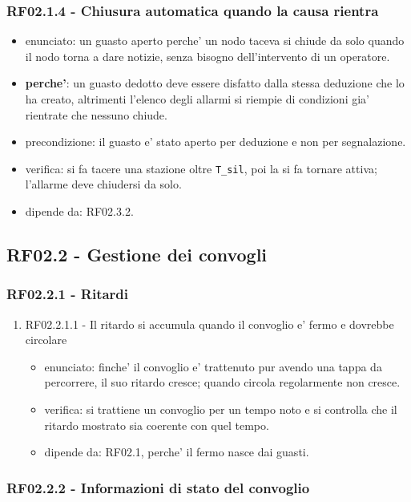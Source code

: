 \documentclass[11pt]{article}
\begin{document}
\subsubsection{RF02.1.4 - Chiusura automatica quando la causa rientra}
\label{sec:orgb6d0a62}
\begin{itemize}
\item enunciato: un guasto aperto perche' un nodo taceva si chiude da solo quando il nodo torna a dare
notizie, senza bisogno dell'intervento di un operatore.
\item \textbf{perche'}: un guasto dedotto deve essere disfatto dalla stessa deduzione che lo ha creato,
altrimenti l'elenco degli allarmi si riempie di condizioni gia' rientrate che nessuno chiude.
\item precondizione: il guasto e' stato aperto per deduzione e non per segnalazione.
\item verifica: si fa tacere una stazione oltre \texttt{T\_sil}, poi la si fa tornare attiva; l'allarme deve
chiudersi da solo.
\item dipende da: RF02.3.2.
\end{itemize}
\subsection{RF02.2 - Gestione dei convogli}
\label{sec:org0355475}

\subsubsection{RF02.2.1 - Ritardi}
\label{sec:org3b67b5d}

\begin{enumerate}
\item RF02.2.1.1 - Il ritardo si accumula quando il convoglio e' fermo e dovrebbe circolare
\label{sec:org220b3a3}
\begin{itemize}
\item enunciato: finche' il convoglio e' trattenuto pur avendo una tappa da percorrere, il suo ritardo
cresce; quando circola regolarmente non cresce.
\item verifica: si trattiene un convoglio per un tempo noto e si controlla che il ritardo mostrato sia
coerente con quel tempo.
\item dipende da: RF02.1, perche' il fermo nasce dai guasti.
\end{itemize}
\end{enumerate}
\subsubsection{RF02.2.2 - Informazioni di stato del convoglio}
\label{sec:org29b8850}
\end{document}
